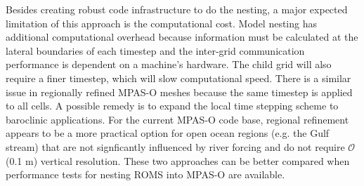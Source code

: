 Besides creating robust code infrastructure to do the nesting, a major expected limitation of this approach is the computational cost. Model nesting has additional computational overhead because information must be calculated at the lateral boundaries of each timestep and the inter-grid communication performance is dependent on a machine's hardware. The child grid will also require a finer timestep, which will slow computational speed. There is a similar issue in regionally refined MPAS-O meshes because the same timestep is applied to all cells. A possible remedy is to expand the local time stepping scheme \citep{lilly2023storm} to baroclinic applications. For the current MPAS-O code base, regional refinement appears to be a more practical option for open ocean regions (e.g. the Gulf stream) that are not signficantly influenced by river forcing and do not require $\mathcal{O}$(0.1 m) vertical resolution. These two approaches can be better compared when performance tests for nesting ROMS into MPAS-O are available. 

